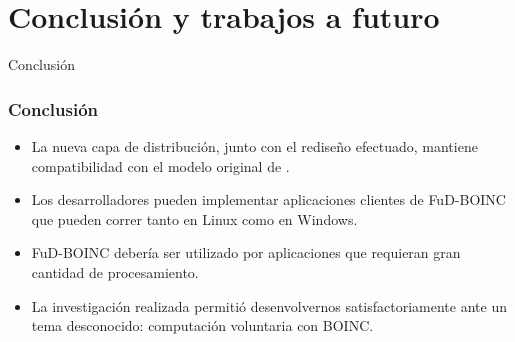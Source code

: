 \section{Conclusión y trabajos a futuro}

\begin{subsection}{Conclusión}

	\begin{frame}\frametitle{Conclusión}
		\begin{itemize}\addtolength{\itemsep}{5mm}
			\item La nueva capa de distribución, junto con el rediseño efectuado, mantiene compatibilidad con el modelo original de \fud.
			\pause
			\item Los desarrolladores pueden implementar aplicaciones clientes de FuD-BOINC que pueden correr tanto en 
			Linux como en Windows.
			\pause
			\item FuD-BOINC debería ser utilizado por aplicaciones que requieran gran cantidad de procesamiento.
			\pause
			\item La investigación realizada permitió desenvolvernos satisfactoriamente ante un tema desconocido: computación 
			voluntaria con BOINC.
		\end{itemize}
	\end{frame}

\end{subsection}


